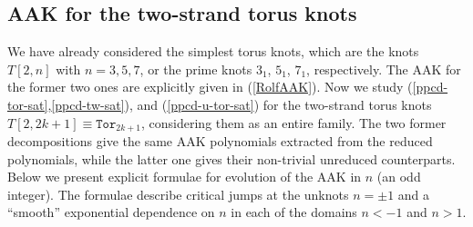 \documentclass[11pt]{article}
\def\Tor{\mathtt{Tor}}
\begin{document}
\subsection{AAK for the two-strand torus knots\label{sec:AAK-tor}}
We have already considered the simplest torus knots, which are the knots $T[2,n]$ with $n=3,5,7$, or the prime knots $3_1$, $5_1$, $7_1$, respectively. The AAK for the former two ones are explicitly given in (\ref{RolfAAK}). Now we study (\ref{ppcd-tor-sat},\ref{ppcd-tw-sat}), and (\ref{ppcd-u-tor-sat}) for
the two-strand torus knots $T[2,2k+1]\equiv\Tor_{2k+1}$, considering them as an entire family. The two former decompositions give the same AAK polynomials extracted from the reduced polynomials, while the latter one gives their non-trivial unreduced counterparts. Below we present explicit formulae for evolution of the AAK in $n$ (an odd integer). The formulae describe critical jumps at the unknots $n=\pm1$ and a ``smooth'' exponential dependence on $n$ in each of the domains $n<-1$ and $n>1$. 
\end{document}
